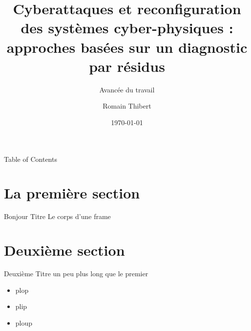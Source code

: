 \documentclass[aspectratio=169]{beamer}
\title{Cyberattaques et reconfiguration des systèmes cyber-physiques : approches basées sur un diagnostic par résidus}
\subtitle{Avancée du travail}
\author[R. Thibert]{Romain Thibert}
\date[2022]{\today}
\begin{document}
\frame{\titlepage}

\begin{frame}{Table of Contents}
\tableofcontents
\end{frame}

\section{La première section}

\begin{frame}{Bonjour Titre}
Le corps d'une frame
\end{frame}

\section{Deuxième section}

\begin{frame}{Deuxième Titre un peu plus long que le premier}
\begin{itemize}
    \item plop
    \pause
    \item plip
    \pause
    \item ploup
\end{itemize}
\end{frame}
\end{document}
